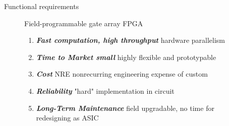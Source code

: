 \documentclass[t,12pt,english
\ifx\beamermode\undefined\else,\beamermode\fi
]{beamer}
\begin{document}
\begin{frame}{Functional requirements}


\begin{figure}[!htb]
\begin{block}{\footnotesize{ Field-programmable gate array FPGA}}\tiny{}
\begin{enumerate} 
\vspace{0.05cm}
     \item \tiny{\textbf{\textit{Fast computation, high throughput}}} \tiny{hardware parallelism}
     \item \tiny{\textbf{\textit{Time to Market small}}} \tiny{highly flexible and prototypable} 
     \item \tiny{\textbf{\textit{Cost}}} \tiny{NRE nonrecurring engineering expense of custom}
     \item \tiny{\textbf{\textit{Reliability}}} \tiny{"hard" implementation in circuit}
     \item \tiny{\textbf{\textit{Long-Term Maintenance}}} \tiny{field upgradable, no time for redesigning as ASIC}
\end{enumerate}
\end{block}


\end{figure}
\end{frame}
\end{document}
